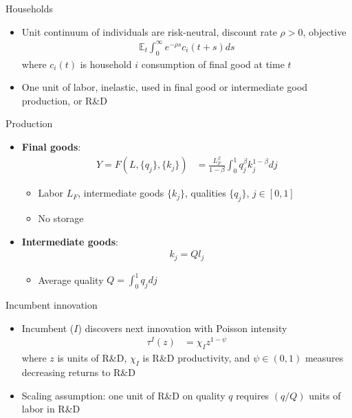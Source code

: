 \documentclass[english,usenames,dvipsnames]{beamer}
\begin{document}
\begin{frame}{Households}
\begin{itemize}
\item Unit continuum of individuals are risk-neutral, discount rate $\rho > 0$, objective
\begin{align*}
\mathbb{E}_t \int_0^{\infty} e^{-\rho s} c_i(t+s) ds
\end{align*}
where $c_i(t)$ is household $i$ consumption of final good at time $t$
\item One unit of labor, inelastic, used in final good or intermediate good production, or R\&D
\end{itemize}
\end{frame}

\begin{frame}{Production}
\begin{itemize}
	\item \textbf{\alert{Final goods}}:
	\begin{align*}
	Y = F(L,\{q_j\},\{k_j\}) &= \frac{L_F^{\beta}}{1-\beta} \int_0^1 q_j^{\beta} k_j^{1-\beta}  dj 
	\end{align*}
	\begin{itemize}
		\item Labor $L_F$, intermediate goods $\{k_j\}$, qualities $\{q_j\}$, $j \in [0,1]$
		\item No storage
	\end{itemize}
	\item \alert{\textbf{Intermediate goods}}:
	\begin{align*}
	k_j = Q l_j
	\end{align*}
	\begin{itemize}
		\item Average quality $Q = \int_0^1 q_j dj$
	\end{itemize}
\end{itemize}
\end{frame}

\begin{frame}{Incumbent innovation}
\begin{itemize}
\item Incumbent ($I$) discovers next innovation with Poisson intensity
\begin{align*}
\tau^I(z) &= \chi_I z^{1-\psi}
\end{align*}
where $z$ is units of R\&D, $\chi_I$ is R\&D productivity, and $\psi \in (0,1)$ measures decreasing returns to R\&D 
\item Scaling assumption: one unit of R\&D on quality $q$ requires $(q/Q)$ units of labor in R\&D
\end{itemize}
\end{frame}
\end{document}
